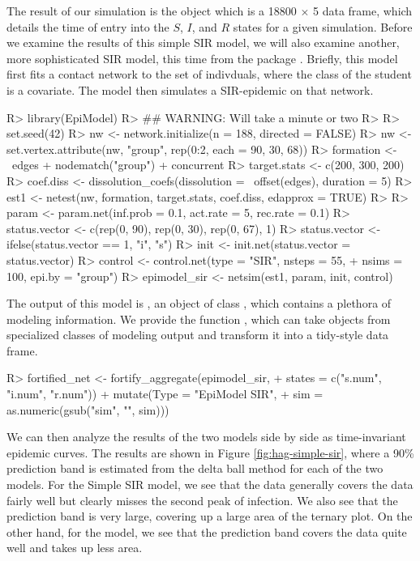 \documentclass[
  shortnames]{jss}
\begin{document}
The result of our simulation is the object  which is a
18800 \(\times\) 5 data frame, which details the time of entry into the
\(S\), \(I\), and \(R\) states for a given simulation. Before we examine
the results of this simple SIR model, we will also examine another, more
sophisticated SIR model, this time from the package .
Briefly, this model first fits a contact network to the set of
indivduals, where the class of the student is a covariate. The model
then simulates a SIR-epidemic on that network.

\begin{CodeChunk}
\begin{CodeInput}
R> library(EpiModel)
R> ## WARNING:  Will take a minute or two
R> 
R> set.seed(42)
R> nw <- network.initialize(n = 188, directed = FALSE)
R> nw <- set.vertex.attribute(nw, "group", rep(0:2, each = 90, 30, 68))
R> formation <- ~edges + nodematch("group") + concurrent
R> target.stats <- c(200, 300, 200)
R> coef.diss <- dissolution_coefs(dissolution = ~offset(edges),  duration = 5)
R> est1 <- netest(nw, formation, target.stats, coef.diss, edapprox = TRUE)
R> 
R> param <- param.net(inf.prob = 0.1, act.rate = 5, rec.rate = 0.1)
R> status.vector <- c(rep(0, 90), rep(0, 30), rep(0, 67), 1)
R> status.vector <- ifelse(status.vector == 1, "i", "s")
R> init <- init.net(status.vector = status.vector)
R> control <- control.net(type = "SIR", nsteps = 55,
+                        nsims = 100, epi.by = "group")
R> epimodel_sir <- netsim(est1, param, init, control)
\end{CodeInput}
\end{CodeChunk}

The output of this model is , an object of class
, which contains a plethora of modeling information. We
provide the function , which can take objects
from specialized classes of modeling output and transform it into a
tidy-style data frame.

\begin{CodeChunk}
\begin{CodeInput}
R> fortified_net <- fortify_aggregate(epimodel_sir, 
+                                    states = c("s.num", "i.num", "r.num")) %
+   mutate(Type = "EpiModel SIR",
+          sim = as.numeric(gsub("sim", "", sim)))
\end{CodeInput}
\end{CodeChunk}

We can then analyze the results of the two models side by side as
time-invariant epidemic curves. The results are shown in Figure
\ref{fig:hag-simple-sir}, where a 90\% prediction band is estimated from
the delta ball method for each of the two models. For the Simple SIR
model, we see that the data generally covers the data fairly well but
clearly misses the second peak of infection. We also see that the
prediction band is very large, covering up a large area of the ternary
plot. On the other hand, for the  model, we see that the
prediction band covers the data quite well and takes up less area.
\end{document}

